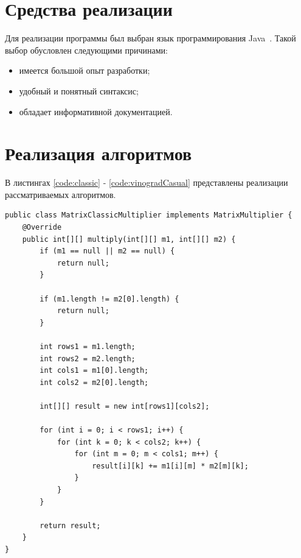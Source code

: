 \documentclass[12pt]{report}
\begin{document}
    \section{Средства реализации}
    Для реализации программы был выбран язык программирования Java~\cite{java}.
    Такой выбор обусловлен следующими причинами:
    \begin{itemize}
        \item имеется большой опыт разработки;
        \item удобный и понятный синтаксис;
        \item обладает информативной документацией.
    \end{itemize}


    \section{Реализация алгоритмов}
    В листингах \ref{code:classic} - \ref{code:vinogradCasual} представлены
    реализации рассматриваемых алгоритмов.

    \begin{lstlisting}[caption=Классический алгоритм, label={code:classic}]
public class MatrixClassicMultiplier implements MatrixMultiplier {
    @Override
    public int[][] multiply(int[][] m1, int[][] m2) {
        if (m1 == null || m2 == null) {
            return null;
        }

        if (m1.length != m2[0].length) {
            return null;
        }

        int rows1 = m1.length;
        int rows2 = m2.length;
        int cols1 = m1[0].length;
        int cols2 = m2[0].length;

        int[][] result = new int[rows1][cols2];

        for (int i = 0; i < rows1; i++) {
            for (int k = 0; k < cols2; k++) {
                for (int m = 0; m < cols1; m++) {
                    result[i][k] += m1[i][m] * m2[m][k];
                }
            }
        }

        return result;
    }
}
    \end{lstlisting}
\end{document}
